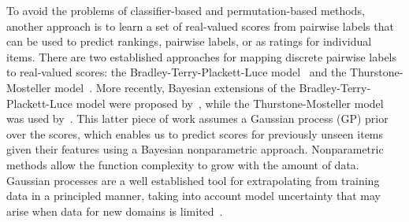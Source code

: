 To avoid the problems of classifier-based and permutation-based methods, 
another approach is to learn a set of real-valued scores from pairwise labels
that can be used to predict rankings, pairwise labels, or as ratings for individual items.
There are two established approaches for mapping discrete pairwise labels to real-valued scores:
the Bradley-Terry-Plackett-Luce model~\cite{bradley1952rank,luce1959possible,plackett1975analysis}
and the Thurstone-Mosteller model~\cite{thurstone1927law,mosteller2006remarks}.
More recently, Bayesian extensions of the Bradley-Terry-Plackett-Luce model
were proposed by~\cite{guiver2009bayesian,volkovs_new_2014}, 
while the Thurstone-Mosteller model was used by~\cite{chu2005preference}.
This latter piece of work assumes a Gaussian process (GP) prior over the scores,
which enables us to predict scores for previously unseen items given their features 
using a Bayesian nonparametric approach.
Nonparametric methods allow the function complexity to grow with the amount of data. 
Gaussian processes are a well established tool for extrapolating from training data 
in a principled manner, taking into account model uncertainty that may arise when 
data for new domains is limited~\cite{rasmussen_gaussian_2006}.


